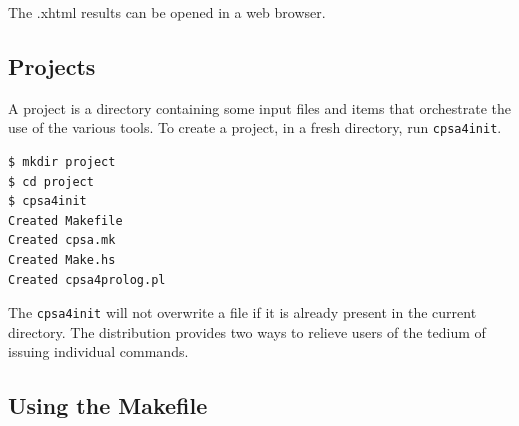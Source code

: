 The .xhtml results can be opened in a web browser.

\subsection{{\cpsa} Projects}\label{sec:cpsainit}

A {\cpsa} project is a directory containing some {\cpsa} input files
and items that orchestrate the use of the various {\cpsa} tools.  To
create a project, in a fresh directory, run \texttt{cpsa4init}.

\begin{verbatim}
$ mkdir project
$ cd project
$ cpsa4init
Created Makefile
Created cpsa.mk
Created Make.hs
Created cpsa4prolog.pl
\end{verbatim}

The \texttt{cpsa4init} will not overwrite a file if it is already
present in the current directory.  The distribution provides two ways
to relieve users of the tedium of issuing individual commands.

\subsection{Using the {\cpsa} Makefile}







